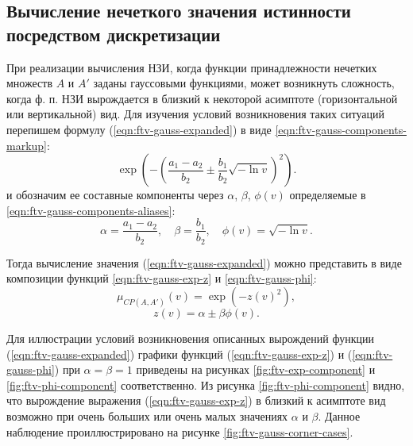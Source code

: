 \subsection{Вычисление нечеткого значения истинности посредством дискретизации}\label{sec:ch3/sect1}

При реализации вычисления НЗИ, когда функции принадлежности нечетких множеств $A$ и $A'$ заданы гауссовыми функциями, может возникнуть сложность, когда ф. п. НЗИ вырождается в близкий к некоторой асимптоте (горизонтальной или вертикальной) вид. Для изучения условий возникновения таких ситуаций перепишем формулу (\ref{eqn:ftv-gauss-expanded}) в виде \eqref{eqn:ftv-gauss-components-markup}:
\begin{equation}
	\label{eqn:ftv-gauss-components-markup}
	\exp\left(-\left(\frac{a_1-a_2}{b_2}\pm\frac{b_1}{b_2}\sqrt{-\ln v}\right)^2\right).
\end{equation}
и обозначим ее составные компоненты через $\alpha$, $\beta$, $\phi(v)$ определяемые в \eqref{eqn:ftv-gauss-components-aliases}:
\begin{equation}
	\label{eqn:ftv-gauss-components-aliases}
	\alpha = \frac{a_1-a_2}{b_2}, \quad \beta = \frac{b_1}{b_2}, \quad \phi(v) = \sqrt{-\ln v}.
\end{equation}

Тогда вычисление значения (\ref{eqn:ftv-gauss-expanded}) можно представить в виде композиции функций \eqref{eqn:ftv-gauss-exp-z} и \eqref{eqn:ftv-gauss-phi}:
\begin{equation}
	\label{eqn:ftv-gauss-exp-z}
	\mu_{CP(A,A')}(v)=\exp(-z(v)^2),
\end{equation}
\begin{equation}
	\label{eqn:ftv-gauss-phi}
	z(v)=\alpha \pm \beta \phi(v).
\end{equation}


Для иллюстрации условий возникновения описанных вырождений функции (\ref{eqn:ftv-gauss-expanded}) графики функций (\ref{eqn:ftv-gauss-exp-z}) и (\ref{eqn:ftv-gauss-phi}) при $\alpha = \beta = 1$ приведены на рисунках \cref{fig:ftv-exp-component} и \cref{fig:ftv-phi-component} соответственно. Из рисунка \cref{fig:ftv-phi-component} видно, что вырождение выражения (\ref{eqn:ftv-gauss-exp-z}) в близкий к асимптоте вид возможно при очень больших или очень малых значениях $\alpha$ и $\beta$. Данное наблюдение проиллюстрировано на рисунке \cref{fig:ftv-gauss-corner-cases}.


